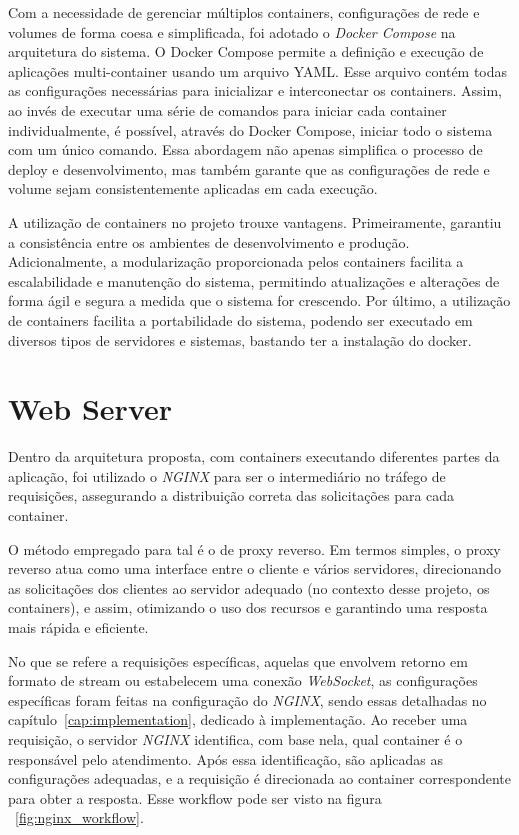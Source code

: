 Com a necessidade de gerenciar múltiplos containers, configurações de rede e volumes de forma coesa e simplificada, foi adotado o \textit{Docker Compose} na arquitetura do sistema. O Docker Compose permite a definição e execução de aplicações multi-container usando um arquivo YAML. Esse arquivo contém todas as configurações necessárias para inicializar e interconectar os containers. Assim, ao invés de executar uma série de comandos para iniciar cada container individualmente, é possível, através do Docker Compose, iniciar todo o sistema com um único comando. Essa abordagem não apenas simplifica o processo de deploy e desenvolvimento, mas também garante que as configurações de rede e volume sejam consistentemente aplicadas em cada execução.

A utilização de containers no projeto trouxe vantagens. Primeiramente, garantiu a consistência entre os ambientes de desenvolvimento e produção. Adicionalmente, a modularização proporcionada pelos containers facilita a escalabilidade e manutenção do sistema, permitindo atualizações e alterações de forma ágil e segura a medida que o sistema for crescendo. Por último, a utilização de containers facilita a portabilidade do sistema, podendo ser executado em diversos tipos de servidores e sistemas, bastando ter a instalação do docker.


\section{Web Server}\label{sec:webserver}

Dentro da arquitetura proposta, com containers executando diferentes partes da aplicação, foi utilizado o \textit{NGINX} para ser o intermediário no tráfego de requisições, assegurando a distribuição correta das solicitações para cada container. 

O método empregado para tal é o de proxy reverso. Em termos simples, o proxy reverso atua como uma interface entre o cliente e vários servidores, direcionando as solicitações dos clientes ao servidor adequado  (no contexto desse projeto, os containers), e assim, otimizando o uso dos recursos e garantindo uma resposta mais rápida e eficiente.

No que se refere a requisições específicas, aquelas que envolvem retorno em formato de stream ou estabelecem uma conexão \textit{WebSocket}, as configurações específicas foram feitas na configuração do \textit{NGINX}, sendo essas detalhadas no capítulo~\ref{cap:implementation},  dedicado à implementação. Ao receber uma requisição, o servidor \textit{NGINX} identifica, com base nela, qual container é o responsável pelo atendimento. Após essa identificação, são aplicadas as configurações adequadas, e a requisição é direcionada ao container correspondente para obter a resposta. Esse workflow pode ser visto na figura ~\ref{fig:nginx_workflow}.

